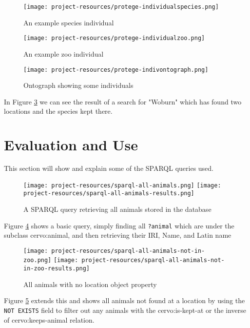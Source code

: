 \documentclass[a4paper]{article}
\begin{document}
\begin{figure}[h!]
	\centering
	\texttt{[image: project-resources/protege-individualspecies.png]}
	\caption{An example species individual}
	\label{fig:speciesindividual}
\end{figure}

\begin{figure}[h!]
	\centering
	\texttt{[image: project-resources/protege-individualzoo.png]}
	\caption{An example zoo individual}
	\label{fig:zooindividual}
\end{figure}

\begin{figure}[h!]
	\centering
	\texttt{[image: project-resources/protege-indivontograph.png]}
	\caption{Ontograph showing some individuals}
	\label{fig:indivontograph}
\end{figure}

In Figure \ref{fig:indivontograph} we can see the result of a search for "Woburn" which has found two locations and the species kept there.



\section{Evaluation and Use}
This section will show and explain some of the SPARQL queries used.

\begin{figure}[H]
	\centering
	\texttt{[image: project-resources/sparql-all-animals.png]}
	\texttt{[image: project-resources/sparql-all-animals-results.png]}
	\caption{A SPARQL query retrieving all animals stored in the database}
	\label{fig:sparql-all-animals}
\end{figure}
Figure \ref{fig:sparql-all-animals} shows a basic query, simply finding all \texttt{?animal} which are under the subclass cervo:animal, and then retrieving their IRI, Name, and Latin name

\begin{figure}[H]
	\centering
	\texttt{[image: project-resources/sparql-all-animals-not-in-zoo.png]}
	\texttt{[image: project-resources/sparql-all-animals-not-in-zoo-results.png]}
	\caption{All animals with no location object property}
	\label{fig:sparql-all-animals-not-in-zoo}
\end{figure}

Figure \ref{fig:sparql-all-animals-not-in-zoo} extends this and shows all animals not found at a location by using the \texttt{NOT EXISTS} field to filter out any animals with the cervo:is-kept-at or the inverse of cervo:keeps-animal relation.
\end{document}
